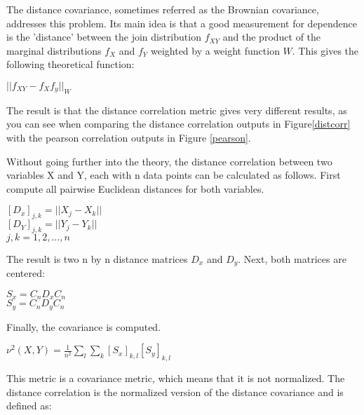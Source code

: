 
The distance covariance, sometimes referred as the Brownian covariance, addresses this problem\citep{distPaper}. Its main idea is that a good measurement for dependence is the 'distance' between the join distribution $f_{XY}$ and the product of the marginal distributions $f_X$ and $f_Y$ weighted by a weight function $W$. This gives the following theoretical function:

\begin{center}
$|| f_{XY} - f_Xf_y||_W$
\end{center}

The result is that the distance correlation metric gives very different results, as you can see when comparing the distance correlation outputs in Figure\ref{distcorr} with the pearson correlation outputs in Figure \ref{pearson}.


Without going further into the theory, the distance correlation between two variables X and Y, each with n data points can be calculated as follows.
First compute all pairwise Euclidean distances for both variables.
\begin{center}
$[D_x]_{j,k} = || X_j - X_k||$ \\
$[D_Y]_{j,k} = || Y_j - Y_k||$ \\
$j,k = 1,2,...,n$\\
\end{center}
The result is two n by n distance matrices $D_x$ and $D_y$. Next, both matrices are centered:
\begin{center}
$S_x = C_nD_xC_n$\\
$S_y = C_nD_yC_n$\\
\end{center}
Finally, the covariance is computed.
\begin{center}
$\nu^2(X,Y) = \frac{1}{n^2} \sum\limits_l \sum\limits_k [S_x]_{k,l}[S_y]_{k,l}$ 
\end{center}

This metric is a covariance metric, which means that it is not normalized. The distance correlation is the normalized version of the distance covariance and is defined as:

